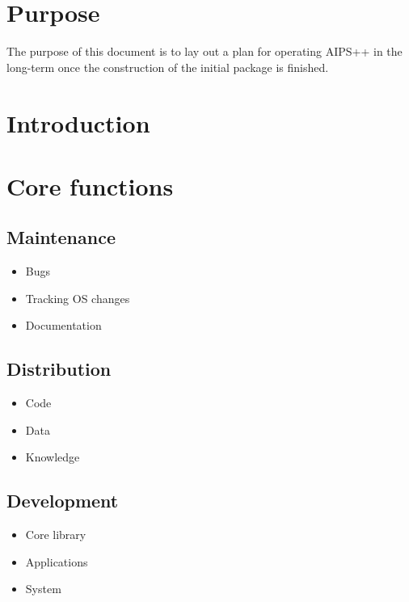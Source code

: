 
\newcommand{\specsURL}{../../specs/specs.html}
\newcommand{\consortiumURL}{../consortium.html}
%
%

%


\section{Purpose}

The purpose of this document is to lay out a plan for operating
AIPS++ in the long-term once the construction of the initial
package is finished.

\section{Introduction}

\section{Core functions}

\subsection{Maintenance}
\begin{itemize}
\item Bugs
\item Tracking OS changes
\item Documentation
\end{itemize}

\subsection{Distribution}
\begin{itemize}
\item Code
\item Data
\item Knowledge
\end{itemize}

\subsection{Development}
\begin{itemize}
\item Core library
\item Applications
\item System
\end{itemize}


